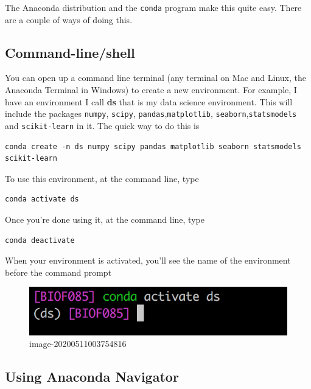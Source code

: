 \documentclass[
  letterpaper,
]{scrbook}
\begin{document}
The Anaconda distribution and the \texttt{conda} program make this quite easy. There are a couple of ways of doing this.

\hypertarget{command-lineshell}{%
\subsection{Command-line/shell}\label{command-lineshell}}

You can open up a command line terminal (any terminal on Mac and Linux, the Anaconda Terminal in Windows) to create a new environment. For example, I have an environment I call \textbf{ds} that is my data science environment. This will include the packages \texttt{numpy}, \texttt{scipy}, \texttt{pandas},\texttt{matplotlib}, \texttt{seaborn},\texttt{statsmodels} and \texttt{scikit-learn} in it. The quick way to do this is

\begin{verbatim}
conda create -n ds numpy scipy pandas matplotlib seaborn statsmodels scikit-learn
\end{verbatim}

To use this environment, at the command line, type

\begin{verbatim}
conda activate ds
\end{verbatim}

Once you're done using it, at the command line, type

\begin{verbatim}
conda deactivate
\end{verbatim}

When your environment is activated, you'll see the name of the environment before the command prompt

\begin{figure}
\centering
\includegraphics{graphs/conda_env.png}
\caption{image-20200511003754816}
\end{figure}

\hypertarget{using-anaconda-navigator}{%
\subsection{Using Anaconda Navigator}\label{using-anaconda-navigator}}
\end{document}
